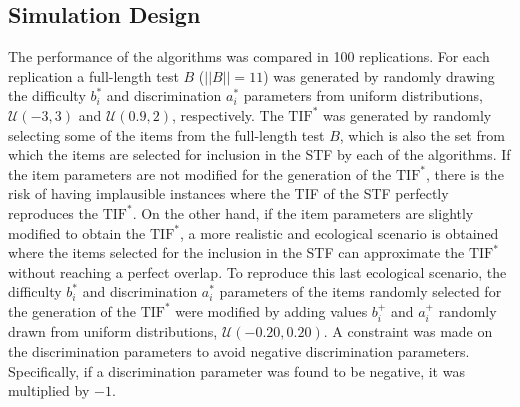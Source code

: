\documentclass[12pt, a4paper, titilepage]{article}
\begin{document}
\subsection*{Simulation Design}
The performance of the algorithms was compared in 100 replications. 
For each replication a full-length test $B$ ($||B|| = 11$) was generated by randomly drawing the difficulty $b_i^*$ and discrimination $a_i^*$ parameters from uniform distributions, $\mathcal{U}(-3,3)$ and $\mathcal{U}(0.9, 2)$, respectively. 
The $\text{TIF}^*$ was generated by randomly selecting some of the items from the full-length test $B$, which is also the set from which the items are selected for inclusion in the STF by each of the algorithms. If the item parameters are not modified for the generation of the $\text{TIF}^*$, there is the risk  of having implausible instances where the TIF of the STF perfectly reproduces the $\text{TIF}^*$. On the other hand, if the item parameters are slightly modified to obtain the $\text{TIF}^*$, a more realistic and ecological scenario is obtained where the items selected for the inclusion in the STF can approximate the $\text{TIF}^*$ without reaching a perfect overlap. 
To reproduce this last ecological scenario, the difficulty $b_i^*$ and discrimination $a_i^*$ parameters of the items randomly selected for the generation of the $\text{TIF}^*$ were modified by adding values  $b_i^+$ and $a_i^+$ randomly drawn from uniform distributions, $\mathcal{U}(-0.20, 0.20)$. 
A constraint was made on the discrimination parameters to avoid negative discrimination parameters. Specifically, if a discrimination parameter was found to be negative, it was multiplied by $-1$. 
\end{document}
